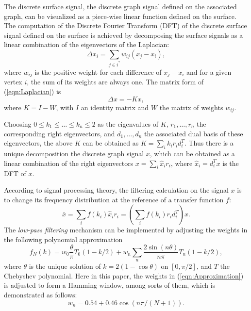The discrete surface signal, the discrete graph signal defined on the associated graph, can be visualized as a piece-wise linear function defined on the surface.
The computation of the Discrete Fourier Transform (DFT) of the discrete surface signal defined on the surface is achieved by decomposing the surface signals as a linear combination of the eigenvectors of the Laplacian: %
\begin{equation}
\label{eqn:Laplacian}
\Delta x_i = \sum_{j \in i^{\ast}} w_{ij} \left( x_j - x_i \right),
\end{equation}
where $w_{ij}$ is the positive weight for each difference of $x_j - x_i$ and for a given vertex $i$, the sum of its weights are always one.
The matrix form of (\ref{eqn:Laplacian}) is
\begin{equation}
\label{eqn:LaplacianMatrix}
\Delta x = - K x,
\end{equation}
where $K = I - W$, with $I$ an identity matrix and $W$ the matrix of weights $w_{ij}$.

Choosing $0 \leq k_1 \leq \ldots \leq k_n \leq 2 $ as the eigenvalues of $K$, $r_1, \ldots, r_n$ the corresponding right eigenvectors, and $d_1, \ldots, d_n$ the associated dual basis of these eigenvectors, the above $K$ can be obtained as $K = \sum_{i} k_i r_i d_i^T$. %
Thus there is a unique decomposition the discrete graph signal $x$, which can be obtained as a linear combination of the right eigenvectors $x = \sum_{i} \hat{x}_i r_i$, %
where $\hat{x}_i = d_i^T x$ is the DFT of $x$.

According to signal processing theory, the filtering calculation on the signal $x$ is to change its frequency distribution at the reference of a transfer function $f$:
\begin{equation}
\bar{x} = \sum_{i} f(k_i) \hat{x}_i r_i = \left( \sum_{i} f(k_i) r_i d_i^T \right) x.
\end{equation}
The \emph{low-pass filtering} mechanism can be implemented by adjusting the weights in the following polynomial approximation
\begin{equation}
\label{eqn:Approximation}
f_{N}(k) = w_0 \frac{\theta}{\pi} T_0 (1 - k / 2) + w_n \sum_{n} \frac{2 \sin (n \theta)}{n \pi} T_n(1 - k / 2),
\end{equation}
where $\theta$ is the unique solution of $k = 2 (1 - \cos \theta)$ on $[0, \pi / 2]$, and $T$ the Chebyshev polynomial.
Here in this paper, the weights in (\ref{eqn:Approximation}) is adjusted to form a Hamming window, among sorts of them, which is demonstrated as follows:
\begin{equation}
\label{eqn:HammingWindow}
w_n = 0.54 + 0.46 \cos (n \pi / (N + 1) ).
\end{equation}

